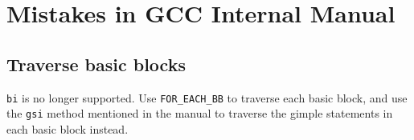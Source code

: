 \documentclass[11pt]{article}
\begin{document}
\pagebreak
\section{Mistakes in GCC Internal Manual}
\subsection{Traverse basic blocks}
\texttt{bi} is no longer supported. Use \texttt{FOR\_EACH\_BB} to traverse each basic block, and use the \texttt{gsi} method mentioned in the manual to traverse the gimple statements in each basic block instead.
\end{document}
